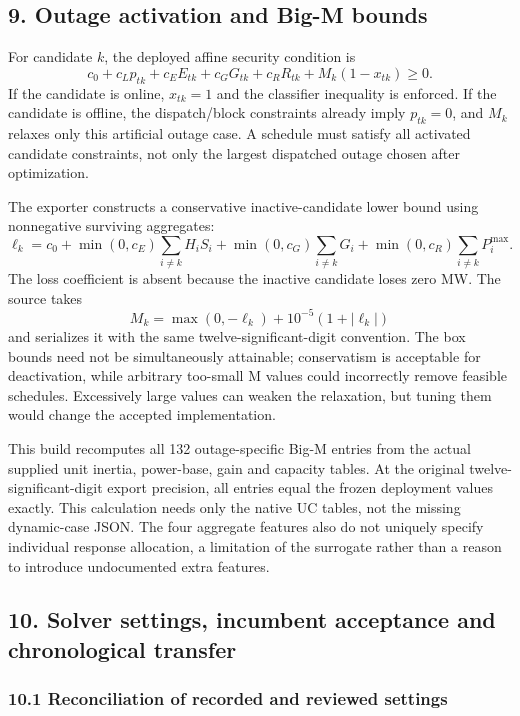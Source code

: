\documentclass[
  11pt,
  a4paper,
]{article}
\begin{document}
\subsection{9. Outage activation and Big-M
bounds}\label{outage-activation-and-big-m-bounds}

For candidate \(k\), the deployed affine security condition is \[
c_0+c_Lp_{tk}+c_EE_{tk}+c_GG_{tk}+c_RR_{tk}+M_k(1-x_{tk})\ge0.
\] If the candidate is online, \(x_{tk}=1\) and the classifier
inequality is enforced. If the candidate is offline, the dispatch/block
constraints already imply \(p_{tk}=0\), and \(M_k\) relaxes only this
artificial outage case. A schedule must satisfy all activated candidate
constraints, not only the largest dispatched outage chosen after
optimization.

The exporter constructs a conservative inactive-candidate lower bound
using nonnegative surviving aggregates: \[
\ell_k=c_0+\min(0,c_E)\sum_{i\ne k}H_iS_i
+\min(0,c_G)\sum_{i\ne k}G_i
+\min(0,c_R)\sum_{i\ne k}P_i^{\max}.
\] The loss coefficient is absent because the inactive candidate loses
zero MW. The source takes \[
M_k=\max(0,-\ell_k)+10^{-5}(1+|\ell_k|)
\] and serializes it with the same twelve-significant-digit convention.
The box bounds need not be simultaneously attainable; conservatism is
acceptable for deactivation, while arbitrary too-small M values could
incorrectly remove feasible schedules. Excessively large values can
weaken the relaxation, but tuning them would change the accepted
implementation.

This build recomputes all 132 outage-specific Big-M entries from the
actual supplied unit inertia, power-base, gain and capacity tables. At
the original twelve-significant-digit export precision, all entries
equal the frozen deployment values exactly. This calculation needs only
the native UC tables, not the missing dynamic-case JSON. The four
aggregate features also do not uniquely specify individual response
allocation, a limitation of the surrogate rather than a reason to
introduce undocumented extra features.

\subsection{10. Solver settings, incumbent acceptance and chronological
transfer}\label{solver-settings-incumbent-acceptance-and-chronological-transfer}

\subsubsection{10.1 Reconciliation of recorded and reviewed
settings}\label{reconciliation-of-recorded-and-reviewed-settings}
\end{document}
